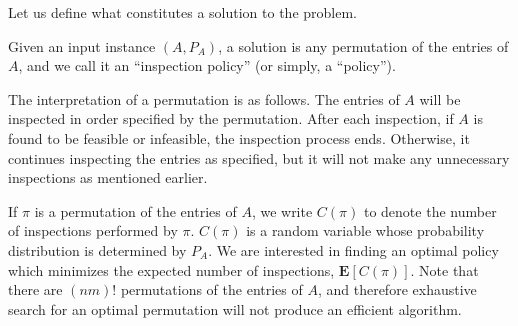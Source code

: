  Let us define what constitutes a solution to the problem. 
 \begin{definition}
 	Given an input instance $(A,P_{A})$, a solution is any permutation of the entries of $A$, and we call it an ``inspection policy'' (or simply, a ``policy'').
 \end{definition}
 The interpretation of a permutation is as follows. The entries of $A$ will be inspected in order specified by the permutation. After each inspection, if $A$ is found to be feasible or infeasible, the inspection process ends. Otherwise, it continues inspecting the entries as specified, but it will not make any unnecessary inspections as mentioned earlier. 

 If $\pi$ is a permutation of the entries of $A$, we write $C(\pi)$ to denote the number of inspections performed by $\pi$. $C(\pi)$ is a random variable whose probability distribution is determined by $P_A$. We are interested in finding an optimal policy which minimizes the expected number of inspections, $\mathbf{E}[C(\pi)]$.
 Note that there are $(nm)!$ permutations of the entries of $A$, and therefore exhaustive search for an optimal permutation will not produce an efficient algorithm. 

